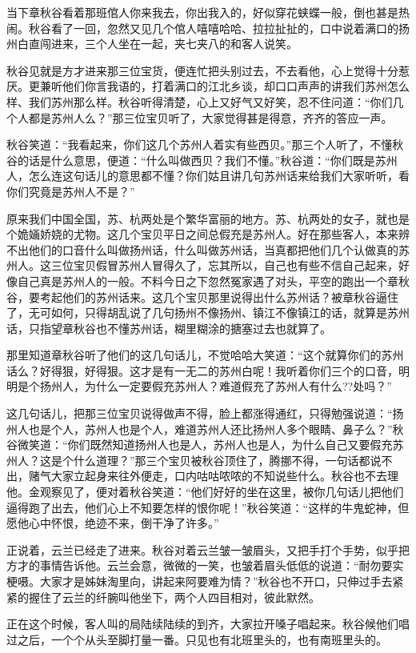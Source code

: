 \documentclass[12pt,UTF8]{ctexbook}
\begin{document}
{{{当下章秋谷看着那班倌人你来我去，你出我入的，好似穿花蛱蝶一般，倒也甚是热闹。秋谷看了一回，忽然又见几个倌人嘻嘻哈哈、拉拉扯扯的，口中说着满口的扬州白直闯进来，三个人坐在一起，夹七夹八的和客人说笑。

秋谷见就是方才进来那三位宝货，便连忙把头别过去，不去看他，心上觉得十分惹厌。更兼听他们你言我语的，打着满口的江北乡谈，却口口声声的讲我们苏州怎么样、我们苏州那么样。秋谷听得清楚，心上又好气又好笑，忍不住问道：“你们几个人都是苏州人么？”那三位宝贝听了，大家觉得甚是得意，齐齐的答应一声。

秋谷笑道：“我看起来，你们这几个苏州人着实有些西贝。”那三个人听了，不懂秋谷的话是什么意思，便道：“什么叫做西贝？我们不懂。”秋谷道：“你们既是苏州人，怎么连这句话儿的意思都不懂？你们姑且讲几句苏州话来给我们大家听听，看你们究竟是苏州人不是？”

原来我们中国全国，苏、杭两处是个繁华富丽的地方。苏、杭两处的女子，就也是个姽婳娇娆的尤物。这几个宝贝平日之间总假充是苏州人。好在那些客人，本来辨不出他们的口音什么叫做扬州话，什么叫做苏州话，当真都把他们几个认做真的苏州人。这三位宝贝假冒苏州人冒得久了，忘其所以，自己也有些不信自己起来，好像自己真是苏州人的一般。不料今日之下忽然冤家遇了对头，平空的跑出一个章秋谷，要考起他们的苏州话来。这几个宝贝那里说得出什么苏州话？被章秋谷逼住了，无可如何，只得胡乱说了几句扬州不像扬州、镇江不像镇江的话，就算是苏州话，只指望章秋谷也不懂苏州话，糊里糊涂的搪塞过去也就算了。

那里知道章秋谷听了他们的这几句话儿，不觉哈哈大笑道：“这个就算你们的苏州话么？好得狠，好得狠。这才是有一无二的苏州白呢！我听着你们三个的口音，明明是个扬州人，为什么一定要假充苏州人？难道假充了苏州人有什么??处吗？”

这几句话儿，把那三位宝贝说得做声不得，脸上都涨得通红，只得勉强说道：“扬州人也是个人，苏州人也是个人，难道苏州人还比扬州人多个眼睛、鼻子么？”秋谷微笑道：“你们既然知道扬州人也是人，苏州人也是人，为什么自己又要假充苏州人？这是个什么道理？”那三个宝贝被秋谷顶住了，腾挪不得，一句话都说不出，赌气大家立起身来往外便走，口内咕咕哝哝的不知说些什么。秋谷也不去理他。金观察见了，便对着秋谷笑道：“他们好好的坐在这里，被你几句话儿把他们逼得跑了出去，他们心上不知要怎样的恨你呢！”秋谷笑道：“这样的牛鬼蛇神，但愿他心中怀恨，绝迹不来，倒干净了许多。”

正说着，云兰已经走了进来。秋谷对着云兰皱一皱眉头，又把手打个手势，似乎把方才的事情告诉他。云兰会意，微微的一笑，也皱着眉头低低的说道：“耐勿要实梗嗫。大家才是姊妹淘里向，讲起来阿要难为情？”秋谷也不开口，只伸过手去紧紧的握住了云兰的纤腕叫他坐下，两个人四目相对，彼此默然。

正在这个时候，客人叫的局陆续陆续的到齐，大家拉开嗓子唱起来。秋谷候他们唱过之后，一个个从头至脚打量一番。只见也有北班里头的，也有南班里头的。

}}}
\end{document}
